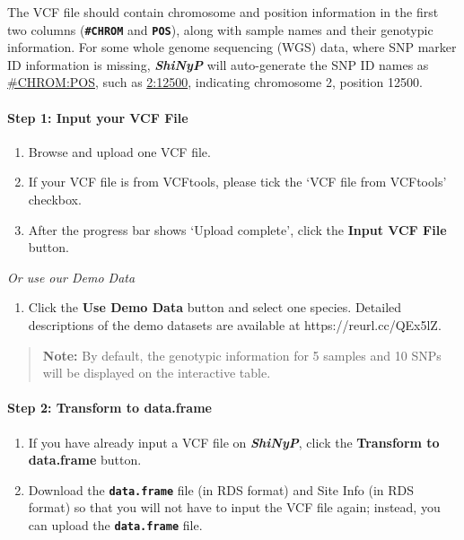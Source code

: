 \documentclass[
]{book}
\providecommand{\tightlist}{%
  \setlength{\itemsep}{0pt}\setlength{\parskip}{0pt}}
\begin{document}
The VCF file should contain chromosome and position information in the first two columns ({\textbf{\texttt{\#CHROM}}} and {\textbf{\texttt{POS}}}), along with sample names and their genotypic information. For some whole genome sequencing (WGS) data, where SNP marker ID information is missing, {\textbf{\emph{ShiNyP}}} will auto-generate the SNP ID names as \ul{\#CHROM:POS}, such as \ul{2:12500}, indicating chromosome 2, position 12500.

\paragraph*{Step 1: Input your VCF File}\label{step-1-input-your-vcf-file}

\begin{enumerate}
\def\labelenumi{\arabic{enumi}.}
\item
  {Browse} and upload one VCF file.
\item
  If your VCF file is from VCFtools, please tick the `VCF file from VCFtools' checkbox.
\item
  After the progress bar shows `Upload complete', click the {\textbf{Input VCF File}} button.
\end{enumerate}

\emph{Or use our Demo Data}

\begin{enumerate}
\def\labelenumi{\arabic{enumi}.}
\tightlist
\item
  Click the {\textbf{Use Demo Data}} button and select one species. Detailed descriptions of the demo datasets are available at https://reurl.cc/QEx5lZ.
\end{enumerate}

\begin{quote}
\textbf{Note:} By default, the genotypic information for 5 samples and 10 SNPs will be displayed on the interactive table.
\end{quote}

\paragraph*{Step 2: Transform to data.frame}\label{step-2-transform-to-data.frame}

\begin{enumerate}
\def\labelenumi{\arabic{enumi}.}
\item
  If you have already input a VCF file on {\textbf{\emph{ShiNyP}}}, click the {\textbf{Transform to data.frame}} button.
\item
  Download the {\textbf{\texttt{data.frame}}} file (in RDS format) and Site Info (in RDS format) so that you will not have to input the VCF file again; instead, you can upload the {\textbf{\texttt{data.frame}}} file.
\end{enumerate}
\end{document}
